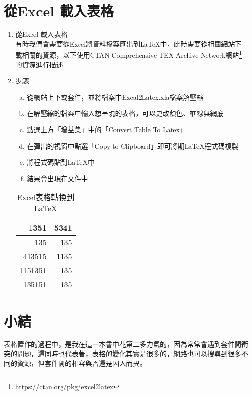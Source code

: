 \section{從Excel 載入表格}
\begin{enumerate}
\item 從Excel 載入表格\\
有時我們會需要從Excel將資料檔案匯出到\LaTeX 中，此時需要從相關網站下載相關的資源，以下使用CTAN Comprehensive TEX Archive Network網站\footnote{https://ctan.org/pkg/excel2latex}的資源進行描述
\item 步驟\\
\begin{enumerate}[a.]
		\item 從網站上下載套件，並將檔案中Excal2Latex.xla檔案解壓縮
		\item 在解壓縮的檔案中輸入想呈現的表格，可以更改顏色、框線與網底
		\item 點選上方「增益集」中的「Convert Table To Latex」
		\item 在彈出的視窗中點選「Copy to Clipboard」即可將期\LaTeX 程式碼複製
		\item 將程式碼貼到\LaTeX 中
		\item 結果會出現在文件中
\end{enumerate}
\begin{table}[htbp][H]
  \centering
  
    \begin{tabular}{|r|r|}
    \toprule
    1351  & 5341 \\
    \midrule
    \textcolor[rgb]{ 1,  0,  0}{135} & \textcolor[rgb]{ 1,  0,  0}{135} \\
    \midrule
    \textcolor[rgb]{ 1,  0,  0}{413515} & \textcolor[rgb]{ 1,  0,  0}{1135} \\
    \midrule
    1151351 & 135 \\
    \midrule
    \rowcolor[rgb]{ 1,  1,  0} 135151 & 135 \\
    \bottomrule
    \end{tabular}\caption{Excel表格轉換到\LaTeX}
  \label{tab:addlabel}%
\end{table}%
\end{enumerate}
\section*{小結}
表格置作的過程中，是我在這一本書中花第二多力氣的，因為常常會遇到套件間衝突的問題，這同時也代表著，表格的變化其實是很多的，網路也可以搜尋到很多不同的資源，但套件間的相容與否還是因人而異。
